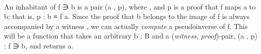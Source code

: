 \begin{code}
\>[1]\AgdaSpace{}%
\AgdaSymbol{:}\AgdaSpace{}%
\AgdaSymbol{(}\AgdaSpace{}%
\AgdaSymbol{:}\AgdaSpace{}%
\AgdaSpace{}%
\AgdaSpace{}%
\AgdaSymbol{)(}\AgdaSpace{}%
\AgdaSymbol{:}\AgdaSpace{}%
\AgdaSymbol{)(}\AgdaSpace{}%
\AgdaSymbol{:}\AgdaSpace{}%
\AgdaSymbol{)}\AgdaSpace{}%
\AgdaSpace{}%
\AgdaSpace{}%
\AgdaSpace{}%
\AgdaSpace{}%
\AgdaSpace{}%
\AgdaSpace{}%
\AgdaSpace{}%
\AgdaSpace{}%
\AgdaSpace{}%
\<%
\\
%
\>[1]\AgdaSpace{}%
\AgdaSpace{}%
\AgdaSpace{}%
\AgdaSpace{}%
\AgdaSpace{}%
\AgdaSymbol{=}\AgdaSpace{}%
\AgdaSpace{}%
\AgdaSpace{}%
\AgdaSpace{}%
\<%
\end{code}
\ccpad
An inhabitant of  \ab f \af ∋ \ab b is a pair (\ab a , \ab p), where , and \ab p is a proof that \ab f maps \ab a to \ab b; that is, \ab p \as : \ab b \ad ≡ \ab f \ab a. Since the proof that \ab b belongs to the image of \ab f is always accompanied by a witness , we can actually \emph{compute} a pseudoinverse of \ab f. This will be a function that takes an arbitrary \ab b \as : \ab B and a (\textit{witness}, \textit{proof})-pair, (\ab a , \ab p) \as :  \ab f \af ∋ \ab b, and returns \ab a.
\ccpad
\begin{code}%
\>[1]\AgdaSpace{}%
\AgdaSymbol{:}\AgdaSpace{}%
\AgdaSymbol{(}\AgdaSpace{}%
\AgdaSymbol{:}\AgdaSpace{}%
\AgdaSpace{}%
\AgdaSpace{}%
\AgdaSymbol{)\{}\AgdaSpace{}%
\AgdaSymbol{:}\AgdaSpace{}%
\AgdaSymbol{\}}\AgdaSpace{}%
\AgdaSpace{}%
\AgdaSpace{}%
\AgdaSpace{}%
\AgdaSpace{}%
%
\>[41]%
\>[44]\<%
\\
%
\>[1]\AgdaSpace{}%
\AgdaSpace{}%
\AgdaSymbol{\{}\AgdaSpace{}%
\AgdaDottedPattern{\AgdaSymbol{)}}\AgdaSymbol{\}}\AgdaSpace{}%
\AgdaSymbol{(}\AgdaSpace{}%
\AgdaSymbol{)}\AgdaSpace{}%
\AgdaSymbol{=}\AgdaSpace{}%
\<%
\\
%
\>[1]\AgdaSpace{}%
\AgdaSpace{}%
\AgdaSymbol{(}\AgdaSpace{}%
\AgdaSymbol{\AgdaUnderscore{}}\AgdaSpace{}%
\AgdaSpace{}%
\AgdaSymbol{\AgdaUnderscore{})}\AgdaSpace{}%
\AgdaSymbol{=}\AgdaSpace{}%
\<%
\end{code}
